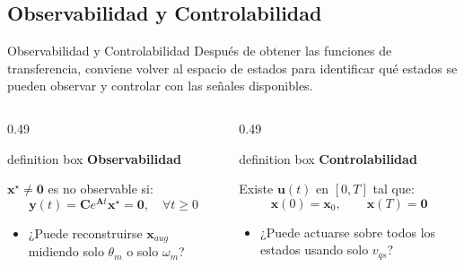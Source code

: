 \documentclass[aspectratio=169,t]{beamer}
\newcommand{\definitionbox}[2]{%
  \begin{beamercolorbox}[wd=\linewidth,sep=0.9ex,leftskip=0.9ex,rightskip=0.9ex]{definition box}%
    {\small\bfseries\color{uncBlue}#1}\par\vspace{0.2mm}%
    {\small #2}%
  \end{beamercolorbox}%
}
\begin{document}
\subsection{Observabilidad y Controlabilidad}
\begin{frame}{Observabilidad y Controlabilidad}
{\small\color{uncGray}Después de obtener las funciones de transferencia, conviene volver al espacio de estados para identificar qué estados se pueden observar y controlar con las señales disponibles.}\par
\vspace{2mm}
\begin{columns}[T,onlytextwidth]

\begin{column}{0.49\textwidth}
\definitionbox{Observabilidad}{
$\bm{x}^\star\neq\bm{0}$ es no observable si:
\[
\bm{y}(t)=\bm{C}e^{\bm{A}t}\bm{x}^\star=\bm{0},\quad \forall t\geq0
\]

}
\vspace{2mm}
\begin{itemize}
  \item ¿Puede reconstruirse $\bm{x}_{aug}$ midiendo solo $\theta_m$ o solo $\omega_m$?
\end{itemize}
\end{column}

\begin{column}{0.49\textwidth}
\definitionbox{Controlabilidad}{
Existe $\bm{u}(t)$ en $[0,T]$ tal que:
\[
\bm{x}(0)=\bm{x}_0,\qquad \bm{x}(T)=\bm{0}
\]

}

\vspace{2mm}
\begin{itemize}
  \item ¿Puede actuarse sobre todos los estados usando solo $v_{qs}$?
\end{itemize}
\end{column}

\end{columns}

\end{frame}
\end{document}

